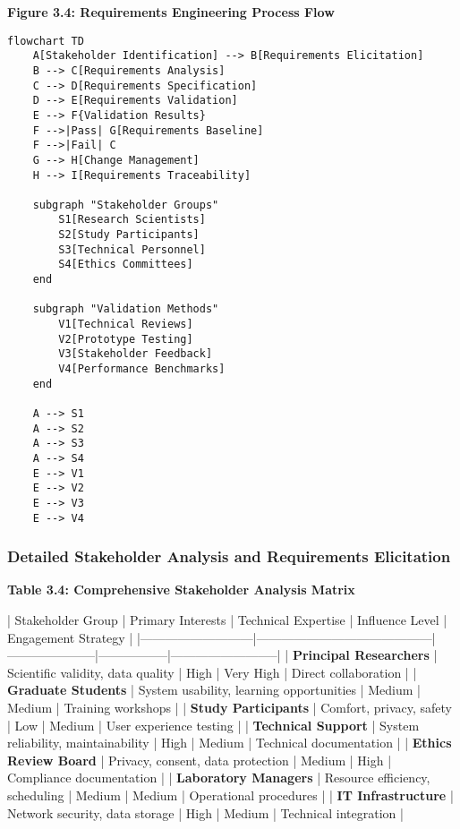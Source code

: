 \documentclass[11pt,a4paper]{report}
\begin{document}
\textbf{Figure 3.4: Requirements Engineering Process Flow}

\begin{verbatim}
flowchart TD
    A[Stakeholder Identification] --> B[Requirements Elicitation]
    B --> C[Requirements Analysis]
    C --> D[Requirements Specification]
    D --> E[Requirements Validation]
    E --> F{Validation Results}
    F -->|Pass| G[Requirements Baseline]
    F -->|Fail| C
    G --> H[Change Management]
    H --> I[Requirements Traceability]

    subgraph "Stakeholder Groups"
        S1[Research Scientists]
        S2[Study Participants]
        S3[Technical Personnel]
        S4[Ethics Committees]
    end

    subgraph "Validation Methods"
        V1[Technical Reviews]
        V2[Prototype Testing]
        V3[Stakeholder Feedback]
        V4[Performance Benchmarks]
    end

    A --> S1
    A --> S2
    A --> S3
    A --> S4
    E --> V1
    E --> V2
    E --> V3
    E --> V4
\end{verbatim}

\subsubsection{Detailed Stakeholder Analysis and Requirements Elicitation}

\textbf{Table 3.4: Comprehensive Stakeholder Analysis Matrix}

| Stakeholder Group         | Primary Interests                        | Technical Expertise | Influence Level | Engagement Strategy      |
|---------------------------|------------------------------------------|---------------------|-----------------|--------------------------|
| \textbf{Principal Researchers} | Scientific validity, data quality        | High                | Very High       | Direct collaboration     |
| \textbf{Graduate Students}     | System usability, learning opportunities | Medium              | Medium          | Training workshops       |
| \textbf{Study Participants}    | Comfort, privacy, safety                 | Low                 | Medium          | User experience testing  |
| \textbf{Technical Support}     | System reliability, maintainability      | High                | Medium          | Technical documentation  |
| \textbf{Ethics Review Board}   | Privacy, consent, data protection        | Medium              | High            | Compliance documentation |
| \textbf{Laboratory Managers}   | Resource efficiency, scheduling          | Medium              | Medium          | Operational procedures   |
| \textbf{IT Infrastructure}     | Network security, data storage           | High                | Medium          | Technical integration    |
\end{document}
